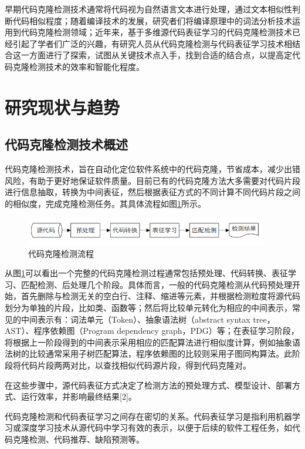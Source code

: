 早期代码克隆检测技术通常将代码视为自然语言文本进行处理，通过文本相似性判断代码相似程度；随着编译技术的发展，研究者们将编译原理中的词法分析技术运用到代码克隆检测领域；近年来，基于多维源代码表征学习的代码克隆检测技术已经引起了学者们广泛的兴趣，有研究人员从代码克隆检测与代码表征学习技术相结合这一方面进行了探索，试图从关键技术点入手，找到合适的结合点，以提高定代码克隆检测技术的效率和智能化程度。


\section{研究现状与趋势}

\subsection{代码克隆检测技术概述}
代码克隆检测技术，旨在自动化定位软件系统中的代码克隆，节省成本，减少出错风险，有助于更好地保证软件质量。目前已有的代码克隆方法大多需要对代码片段进行信息抽取，转换为中间表征，然后根据表征方式的不同计算不同代码片段之间的相似度，完成克隆检测任务。其具体流程如图\ref{fig:figure1}所示。
\begin{figure}
    \centering
    \includegraphics[width=0.95\textwidth]{figures/figure1}
    \caption{代码克隆检测流程}\label{fig:figure1}
\end{figure}

从图\ref{fig:figure1}可以看出一个完整的代码克隆检测过程通常包括预处理、代码转换、表征学习、匹配检测、后处理几个阶段。具体而言，一般的代码克隆检测从代码预处理开始，首先删除与检测无关的空白行、注释、缩进等元素，并根据检测粒度将源代码划分为单独的片段，比如类、函数等；然后将比较单元转化为相应的中间表示，常见的中间表示有：词法单元（Token）、抽象语法树（abstract syntax tree，AST）、程序依赖图（Program dependency graph，PDG）等；在表征学习阶段，将根据上一阶段得到的中间表示采用相应的匹配算法进行相似度计算，例如抽象语法树的比较通常采用子树匹配算法，程序依赖图的比较则采用子图同构算法。此阶段将代码片段两两对比，以查找相似代码源片段，得到代码克隆对。

在这些步骤中，源代码表征方式决定了检测方法的预处理方式、模型设计、部署方式、运行效率，并影响最终结果[2]。

代码克隆检测和代码表征学习之间存在密切的关系。代码表征学习是指利用机器学习或深度学习技术从源代码中学习有效的表示，以便于后续的软件工程任务，如代码克隆检测、代码推荐、缺陷预测等。

